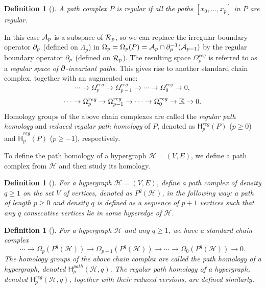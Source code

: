 \documentclass{amsart}
\newtheorem{definition}[theorem]{Definition}
\newcommand{\Hgroup}	     {\mathsf{H}}
\renewcommand{\H}{\mathcal{H}}
\newcommand{\bdr}{\mm{\mathrm{\partial}}}
\newcommand {\mm}[1]        {\ifmmode{#1}\else{\mbox{\(#1\)}}\fi}
\newcommand{\Kspace}        {\mm{{\mathbb K}}}
\newcommand{\Acal}        {\mm{\mathcal A}}
\newcommand{\Rcal}        {\mm{\mathcal R}}
\begin{document}
\begin{definition}[{\cite[Definition 3.4]{GrigoryanLinMuranov2020}}]
A path complex $P$ is \emph{regular} if all the paths $[x_0, \dots, x_p]$ in $P$ are regular. 
\end{definition}

In this case $\Acal_p$ is a subspace of $\Rcal_p$, so we can replace the irregular boundary operator $\bdr_p$ (defined on $\Lambda_p$) in $\Omega_p = \Omega_p(P) = \Acal_p \cap \bdr_p^{-1}(\Acal_{p-1})$ by the regular boundary operator $\bdr_p$ (defined on $\Rcal_p$).  
The resulting space $\Omega_p^{reg}$ is referred to as a \emph{regular space of $\bdr$-invariant paths}. 
This gives rise to another standard chain complex, together with an augmented one:
\[
\cdots  \to \Omega_p^{reg} \to \Omega_{p-1}^{reg} \to \cdots \to \Omega_0^{reg} \to 0,   
\] 
\[
\cdots  \to \Omega_p^{reg} \to \Omega_{p-1}^{reg} \to \cdots \to \Omega_0^{reg} \to \Kspace \to 0.  
\]
Homology groups of the above chain complexes are called the \emph{regular path homology} and \emph{reduced regular path homology} of $P$, denoted as $\Hgroup^{reg}_p(P)$ ($p \geq 0$) and $\tilde{\Hgroup}^{reg}_p(P)$ ($p \geq -1$), respectively. 




To define the path homology of a hypergraph $\H=(V, E)$, we define a path complex from $\H$ and then study its homology. 
\begin{definition}[{\cite[Definition 5.5]{GrigoryanJimenezMuranov2019}}]
For a hypergraph $\H=(V, E)$, define a path complex of density $q \geq 1$ on the set $V$ of vertices, denoted as $P^q(\H)$, in the following way: 
a path of length $p \geq 0$ and density $q$ is defined as a sequence of $p+1$ vertices such that any $q$ consecutive vertices lie in some hyperedge of $\H$.
\end{definition}


\begin{definition}[{\cite[Definition 5.12]{GrigoryanJimenezMuranov2019}}]
\label{def:hypergraph-path-homology}
For a hypergraph $\H$ and any $q \geq 1$, we have a standard chain complex 
\[
\cdots  \to \Omega_{p}(P^q(\H)) \to \Omega_{p-1}(P^q(\H)) \to \cdots \to \Omega_{0}(P^q(\H)) \to 0.     
\]
The homology groups of the above chain complex are called the \emph{path homology of a hypergraph}, denoted $\Hgroup_p^{path}(\H, q)$. 
The \emph{regular path homology of a hypergraph}, denoted $\Hgroup^{reg}_p(\H, q)$, together with their reduced versions, are defined similarly. 
\end{definition}
\end{document}
